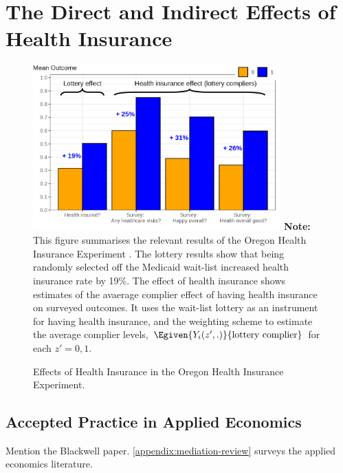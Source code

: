 \section{The Direct and Indirect Effects of Health Insurance}
\label{sec:healthinsurance}


\begin{figure}[h!]
    \caption{Effects of Health Insurance in the Oregon Health Insurance Experiment.}
    \centering
    \includegraphics[width=0.85\textwidth]{sections/figures/insurance-effects.png}
    \label{fig:healthinsurance-effects}
    \justify
    \footnotesize    
    \textbf{Note:}
    This figure summarises the relevant results of the Oregon Health Insurance Experiment \citep{finkelstein2008oregon}.
    The lottery results show that being randomly selected off the Medicaid wait-list increased health insurance rate by 19\%.
    The effect of health insurance shows estimates of the avaerage complier effect of having health insurance on surveyed outcomes.
    It uses the wait-list lottery as an instrument for having health insurance, and the \cite{abadie2003semiparametric} weighting scheme to estimate the average complier levels, $\Egiven{Y_i(z',.)}{\text{lottery complier}}$ for each $z'=0,1$.
\end{figure}


\subsection{Accepted Practice in Applied Economics}

Mention the Blackwell paper.
\autoref{appendix:mediation-review} surveys the applied economics literature.
